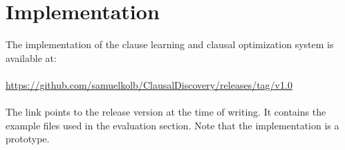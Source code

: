 \chapter{Implementation}
The implementation of the clause learning and clausal optimization system is available at:
\\\\
\url{https://github.com/samuelkolb/ClausalDiscovery/releases/tag/v1.0}
\\\\
The link points to the release version at the time of writing.
It contains the example files used in the evaluation section.
Note that the implementation is a prototype.